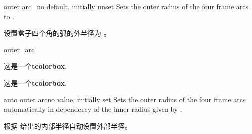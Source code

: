 \begin{docTcbKey}{outer arc}{=}{no default, initially unset}
Sets the outer radius of the four frame arcs to .

设置盒子四个角的弧的外半径为 。
\begin{exdispExample}{outer_arc}

\begin{tcolorbox}[arc=4mm,outer arc=1mm]
这是一个\textbf{tcolorbox}.
\end{tcolorbox}
\begin{tcolorbox}[arc=4mm]
这是一个\textbf{tcolorbox}.
\end{tcolorbox}
\end{exdispExample}
\end{docTcbKey}

\begin{docTcbKey}{auto outer arc}{}{no value, initially set}
Sets the outer radius of the four frame arcs automatically in
dependency of the inner radius given by .

根据  给出的内部半径自动设置外部半径。

\end{docTcbKey}
  
